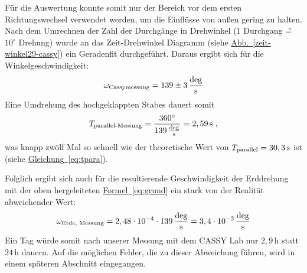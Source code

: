 \documentclass[halfparskip, 11pt]{scrartcl}
\newcommand{\unit}[1]{\ensuremath{\,\mathrm{#1}}} %
\newcommand{\degr}{\ensuremath{^\circ}}
\newcommand{\ee}[1]{\ensuremath{\cdot 10^{#1}}}
\newcommand{\ltext}[1]{\ensuremath{_{\textnormal{#1}}}}
\newcommand{\hypref}[2]{\hyperref[#2]{{#1}~\ref{#2}}}
\begin{document}
F\"ur die Auswertung konnte somit nur der Bereich vor dem ersten Richtungswechsel verwendet werden, um die Einfl\"usse von au\ss{}en gering zu halten. Nach dem Umrechnen der Zahl der Durchg\"ange in Drehwinkel (1 Durchgang \^{=} $10^\circ$ Drehung) wurde an das \glqq Zeit-Drehwinkel\grqq{} Diagramm (siehe \hypref{Abb.}{zeit-winkel29-cassy}) ein Geradenfit durchgef\"uhrt. Daraus ergibt sich f\"ur die Winkelgeschwindigkeit:
\begin{equation}
\omega\ltext{Cassymessung} = 139\pm 3 \unit{\frac{deg}{s}}
\end{equation}
Eine Umdrehung des hochgeklappten Stabes dauert somit 
\begin{equation}
T\ltext{parallel-Messung}
=\frac{360\degr}{139 \unit{\frac{deg}{s}}}=2,59 \unit{s} \ ,
\end{equation}
was knapp zwölf Mal so schnell wie der theoretische Wert von $T\ltext{parallel}= 30,3 \unit{s}$ ist (siehe \hypref{Gleichung}{eq:tpara}).

Folglich ergibt sich auch f\"ur die resultierende Geschwindigkeit der Erddrehung mit der oben hergeleiteten \hypref{Formel}{eq:grund} ein stark von der Realit\"at abweichender Wert:
\begin{equation}
\omega\ltext{Erde, Messung} = 
2,48\ee{-4}\cdot
139 \unit{\frac{deg}{s}}
= 3,4\ee{-2} \unit{\frac{deg}{s}}
\end{equation}
Ein Tag würde somit nach unserer Messung mit dem CASSY Lab nur $2,9 \unit{h}$ statt $24 \unit{h}$ dauern. Auf die möglichen Fehler, die zu dieser Abweichung f\"uhren, wird in einem sp\"ateren Abschnitt eingegangen.



\FloatBarrier
\end{document}
